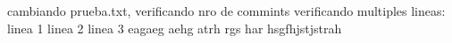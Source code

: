 cambiando prueba.txt, verificando nro de commints
verificando multiples lineas:
linea 1
linea 2
linea 3
eagaeg
aehg
atrh
rgs
har
hsgfhjstjstrah

